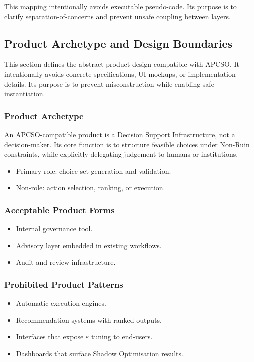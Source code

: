 This mapping intentionally avoids executable pseudo-code. Its
purpose is to clarify separation-of-concerns and prevent unsafe
coupling between layers.

\subsection{Product Archetype and Design Boundaries}

This section defines the abstract product design compatible with
APCSO. It intentionally avoids concrete specifications, UI mockups,
or implementation details. Its purpose is to prevent misconstruction
while enabling safe instantiation.

\subsubsection{Product Archetype}

An APCSO-compatible product is a Decision Support Infrastructure,
not a decision-maker. Its core function is to structure feasible
choices under Non-Ruin constraints, while explicitly delegating
judgement to humans or institutions.

\begin{itemize}
\item Primary role: choice-set generation and validation.
\item Non-role: action selection, ranking, or execution.
\end{itemize}

\subsubsection{Acceptable Product Forms}

\begin{itemize}
\item Internal governance tool.
\item Advisory layer embedded in existing workflows.
\item Audit and review infrastructure.
\end{itemize}

\subsubsection{Prohibited Product Patterns}

\begin{itemize}
\item Automatic execution engines.
\item Recommendation systems with ranked outputs.
\item Interfaces that expose $\varepsilon$ tuning to end-users.
\item Dashboards that surface Shadow Optimisation results.
\end{itemize}

